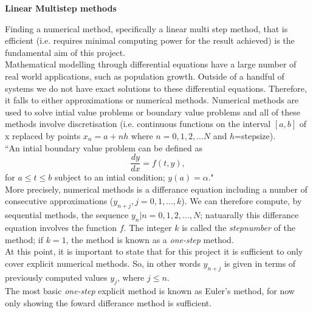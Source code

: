 \documentclass[11pt]{article}
\begin{document}

\begin{center}
{\bf Linear Multistep methods }
\end{center}


\hspace*{1em}Finding a numerical method, specifically a linear multi step method, that is efficient (i.e. requires minimal computing power for the result achieved) is the fundamental aim of this project.\\
\hspace*{1em}Mathematical modelling through differential equations have a large number of real world applications, such as population growth. Outside of a handful of systems we do not have exact solutions to these differential equations. Therefore, it falls to either approximations or numerical methods. Numerical methods are used to solve intial value problems or boundary value problems and all of these methods involve discretisation (i.e. continuous functions on the interval $[a,b]$ of x replaced by points $x_{n}=a+nh$ where $n=0,1,2,...N$ and $h$=stepsize).\\
``An intial boundary value problem can be defined as 
\begin{equation}
\frac{dy}{dx}=f(t,y),
\end{equation}
for $a\leq t\leq b$ subject to an intial condition; $y(a)=\alpha$."  \citep{Faires}\\
\hspace*{1em}    More precisely, numerical methods is a differance equation including a number of consecutive approximations ($y_{n+j},j=0,1,...,k$). We can therefore compute, by sequential methods, the sequence {$y_{n}|n=0,1,2,...,N$}; natuarally this differance equation involves the function $f$. The integer $k$ is called the \textit{stepnumber} of the method; if $k=1$, the method is known as a \textit{one-step} method. \citep{Lambert1991}\\
\hspace*{1em}    At this point, it is important to state that for this project it is sufficient to only cover explicit numerical methods. So, in other words $y_{n+j}$ is given in terms of previously computed values $y_{j}$, where $j\leq n$.\\
\hspace*{1em}    The most basic \textit{one-step} explicit method is known as Euler's method, for now only showing the foward differance method is sufficient.
\end{document}
